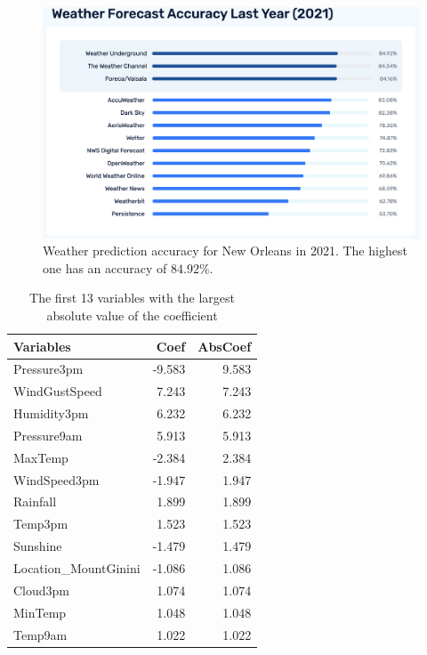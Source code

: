 \documentclass[11pt, a4paper, jou]{apa7}
\begin{document}
\begin{figure}[h]
    \centering
    \caption{Weather prediction accuracy for New Orleans in 2021. The highest one has an accuracy of $84.92\%$. }\label{fig:weather_prediction_nola}
    \includegraphics[width=.55\textwidth]{figures/Weather2021.png}
\end{figure}

\begin{table}[h]
\centering
\caption{The first 13 variables with the largest absolute value of the coefficient}
\label{tab:rank_coef}
\begin{tabular}{lrr}
\hline
Variables             & Coef   & AbsCoef \\ \hline
Pressure3pm           & -9.583 & 9.583   \\
WindGustSpeed         & 7.243  & 7.243   \\
Humidity3pm           & 6.232  & 6.232   \\
Pressure9am           & 5.913  & 5.913   \\
MaxTemp               & -2.384 & 2.384   \\
WindSpeed3pm          & -1.947 & 1.947   \\
Rainfall              & 1.899  & 1.899   \\
Temp3pm               & 1.523  & 1.523   \\
Sunshine              & -1.479 & 1.479   \\
Location\_MountGinini & -1.086 & 1.086   \\
Cloud3pm              & 1.074  & 1.074   \\
MinTemp               & 1.048  & 1.048   \\
Temp9am               & 1.022  & 1.022   \\ \hline
\end{tabular}
\end{table}
\end{document}
